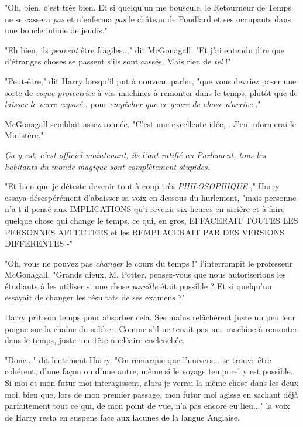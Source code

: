 "Oh, bien, c'est très bien. Et si quelqu'un me bouscule, le Retourneur de Temps ne se cassera \emph{pas}  et n'enferma \emph{pas}  le château de Poudlard et ses occupants dans une boucle infinie de jeudis."

"Eh bien, ils \emph{peuvent}  être fragiles..." dit McGonagall. "Et j'ai entendu dire que d'étranges choses se passent s'ils sont cassés. Mais rien de \emph{tel}  !"

"Peut-être," dit Harry lorsqu'il put à nouveau parler, "que vous devriez poser une sorte de \emph{coque protectrice}  à vos machines à remonter dans le temps, plutôt que de \emph{laisser le verre exposé} , pour \emph{empêcher que ce genre de chose n'arrive} ."

McGonagall semblait assez sonnée. "C'est une excellente idée, . J'en informerai le Ministère."

\emph{Ça y est, c'est officiel maintenant, ils l'ont ratifié au Parlement, tous les habitants du monde magique sont complètement stupides.} 

"Et bien que je déteste devenir tout à coup très \emph{PHILOSOPHIQUE} ," Harry essaya désespérément d'abaisser sa voix en-dessous du hurlement, "mais personne n'a-t-il pensé aux IMPLICATIONS qu'i revenir six heures en arrière et à faire quelque chose qui change le temps, ce qui, en gros, EFFACERAIT TOUTES LES PERSONNES AFFECTEES et les REMPLACERAIT PAR DES VERSIONS DIFFERENTES -"

"Oh, vous ne pouvez pas \emph{changer}  le cours du temps !" l'interrompit le professeur McGonagall. "Grands dieux, M. Potter, pensez-vous que nous autoriserions les étudiants à les utiliser si une chose \emph{pareille}  était possible ? Et si quelqu'un essayait de changer les résultats de ses examens ?"

Harry prit son temps pour absorber cela. Ses mains relâchèrent juste un peu leur poigne sur la chaîne du sablier. Comme s'il ne tenait pas une machine à remonter dans le temps, juste une tête nucléaire enclenchée.

"Donc..." dit lentement Harry. "On remarque que l'univers... se trouve être cohérent, d'une façon ou d'une autre, même si le voyage temporel y est possible. Si moi et mon futur moi interagissent, alors je verrai la même chose dans les deux moi, bien que, lors de mon premier passage, mon futur moi agisse en sachant déjà parfaitement tout ce qui, de mon point de vue, n'a pas encore eu lieu..." la voix de Harry resta en suspens face aux lacunes de la langue Anglaise.

